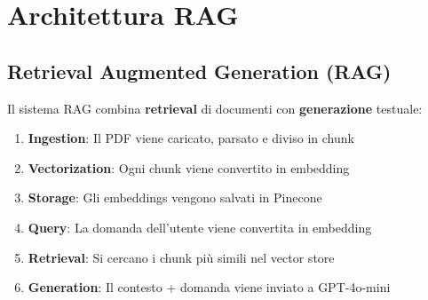 \documentclass[11pt,a4paper]{article}
\begin{document}
\section{Architettura RAG}

\subsection{Retrieval Augmented Generation (RAG)}

Il sistema RAG combina \textbf{retrieval} di documenti con \textbf{generazione} testuale:

\begin{enumerate}
    \item \textbf{Ingestion}: Il PDF viene caricato, parsato e diviso in chunk
    \item \textbf{Vectorization}: Ogni chunk viene convertito in embedding
    \item \textbf{Storage}: Gli embeddings vengono salvati in Pinecone
    \item \textbf{Query}: La domanda dell'utente viene convertita in embedding
    \item \textbf{Retrieval}: Si cercano i chunk più simili nel vector store
    \item \textbf{Generation}: Il contesto + domanda viene inviato a GPT-4o-mini
\end{enumerate}
\end{document}
